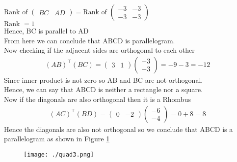 \documentclass[12pt]{article}
\newcommand{\myvec}[1]{\ensuremath{\begin{pmatrix}#1\end{pmatrix}}}
\begin{document}
\begin{enumerate}
	$\text{Rank of } \myvec{BC & AD} = \text{Rank of }\myvec{-3&-3\\-3&-3}$\\
	$\text{Rank } = 1$\\
	Hence, BC is parallel to AD\\
	From here we can conclude that ABCD is parallelogram.\\
	Now checking if the adjacent sides are orthogonal to each other
	\begin{align}
		(AB)^\top (BC) = \myvec{3&1} \myvec{-3\\-3} = -9-3 = -12
	\end{align}
	Since inner product is not zero so AB and BC are not orthogonal.\\
	Hence, we can say that ABCD is neither a rectangle nor a square.\\
	Now if the diagonals are also orthogonal then it is a Rhombus
	\begin{align}
		(AC)^\top (BD) = \myvec{0&-2} \myvec{-6\\-4} = 0+8 = 8
	\end{align}
	Hence the diagonals are also not orthogonal so we conclude that ABCD is a parallelogram as shown in Figure \ref{fig:Fig3}

\begin{figure}[!h]
	\begin{center} 
	    \texttt{[image: ./quad3.png]}
	\end{center}
\caption{}
\label{fig:Fig3}
\end{figure}
\end{enumerate}
\end{document}
